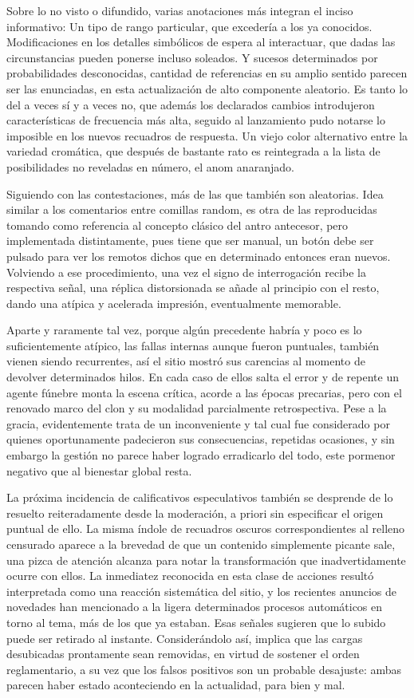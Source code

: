 \documentclass[
]{book}
\begin{document}
Sobre lo no visto o difundido, varias anotaciones más integran el inciso informativo: Un tipo de rango particular, que excedería a los ya conocidos. Modificaciones en los detalles simbólicos de espera al interactuar, que dadas las circunstancias pueden ponerse incluso soleados. Y sucesos determinados por probabilidades desconocidas, cantidad de referencias en su amplio sentido parecen ser las enunciadas, en esta actualización de alto componente aleatorio. Es tanto lo del a veces sí y a veces no, que además los declarados cambios introdujeron características de frecuencia más alta, seguido al lanzamiento pudo notarse lo imposible en los nuevos recuadros de respuesta. Un viejo color alternativo entre la variedad cromática, que después de bastante rato es reintegrada a la lista de posibilidades no reveladas en número, el anom anaranjado.

Siguiendo con las contestaciones, más de las que también son aleatorias. Idea similar a los comentarios entre comillas random, es otra de las reproducidas tomando como referencia al concepto clásico del antro antecesor, pero implementada distintamente, pues tiene que ser manual, un botón debe ser pulsado para ver los remotos dichos que en determinado entonces eran nuevos. Volviendo a ese procedimiento, una vez el signo de interrogación recibe la respectiva señal, una réplica distorsionada se añade al principio con el resto, dando una atípica y acelerada impresión, eventualmente memorable.

Aparte y raramente tal vez, porque algún precedente habría y poco es lo suficientemente atípico, las fallas internas aunque fueron puntuales, también vienen siendo recurrentes, así el sitio mostró sus carencias al momento de devolver determinados hilos. En cada caso de ellos salta el error y de repente un agente fúnebre monta la escena crítica, acorde a las épocas precarias, pero con el renovado marco del clon y su modalidad parcialmente retrospectiva. Pese a la gracia, evidentemente trata de un inconveniente y tal cual fue considerado por quienes oportunamente padecieron sus consecuencias, repetidas ocasiones, y sin embargo la gestión no parece haber logrado erradicarlo del todo, este pormenor negativo que al bienestar global resta.

La próxima incidencia de calificativos especulativos también se desprende de lo resuelto reiteradamente desde la moderación, a priori sin especificar el origen puntual de ello. La misma índole de recuadros oscuros correspondientes al relleno censurado aparece a la brevedad de que un contenido simplemente picante sale, una pizca de atención alcanza para notar la transformación que inadvertidamente ocurre con ellos. La inmediatez reconocida en esta clase de acciones resultó interpretada como una reacción sistemática del sitio, y los recientes anuncios de novedades han mencionado a la ligera determinados procesos automáticos en torno al tema, más de los que ya estaban. Esas señales sugieren que lo subido puede ser retirado al instante. Considerándolo así, implica que las cargas desubicadas prontamente sean removidas, en virtud de sostener el orden reglamentario, a su vez que los falsos positivos son un probable desajuste: ambas parecen haber estado aconteciendo en la actualidad, para bien y mal.
\end{document}
